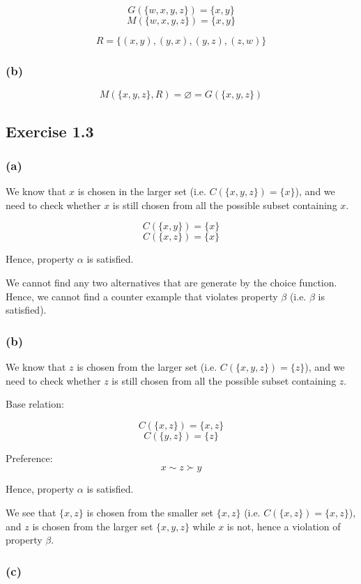 \documentclass[a4paper]{article}
\begin{document}
\[G(\{w,x,y,z\})=\{x,y\} \]
\[M(\{w,x,y,z\})=\{x,y\} \]

\[R=\{(x,y), (y,x), (y,z), (z,w) \} \]

\subsubsection*{(b)}

\[M(\{x,y,z\}, R)=\varnothing=G(\{x,y,z\}) \]

\subsection*{Exercise 1.3}

\subsubsection*{(a)}

We know that $x$ is chosen in the larger set (i.e. $C(\{x,y,z\})=\{x\}$), and we need to check whether $x$ is still chosen from all the possible subset containing $x$.

\[C(\{x,y\})=\{x\} \]
\[C(\{x,z\})=\{x\} \]

Hence, property $\alpha$ is satisfied.

We cannot find any two alternatives that are generate by the choice function. Hence, we cannot find a counter example that violates property $\beta$ (i.e. $\beta$ is satisfied).

\subsubsection*{(b)}

We know that $z$ is chosen from the larger set (i.e. $C(\{x,y,z\})=\{z\}$), and we need to check whether $z$ is still chosen from all the possible subset containing $z$.

Base relation:

\[C(\{x,z\})=\{x,z\} \]
\[C(\{y,z\})=\{z\} \]

Preference:
\[x\sim z \succ y \]

Hence, property $\alpha$ is satisfied.

We see that $\{x,z\}$ is chosen from the smaller set $\{x,z\}$ (i.e. $C(\{x,z\})=\{x,z\}$), and $z$ is chosen from the larger set $\{x,y,z\}$ while $x$ is not, hence a violation of property $\beta$.

\subsubsection*{(c)}
\end{document}
